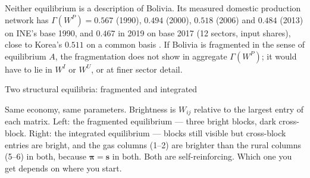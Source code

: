 \documentclass[../structural_economics_book.tex]{subfiles}
\begin{document}
\begin{example}
Neither equilibrium is a description of Bolivia. Its measured domestic production network has $\Gamma(W^P) = 0.567$ (1990), $0.494$ (2000), $0.518$ (2006) and $0.484$ (2013) on INE's base 1990, and $0.467$ in 2019 on base 2017 (12 sectors, input shares), close to Korea's $0.511$ on a common basis \citep{ine2026sut,oecd2023icio}. If Bolivia is fragmented in the sense of equilibrium $A$, the fragmentation does not show in aggregate $\Gamma(W^P)$; it would have to lie in $W^I$ or $W^U$, or at finer sector detail.
\end{example}

\begin{vizpanel}{Two structural equilibria: fragmented and integrated}
\begin{center}
\end{center}
\vspace{-0.5em}
\small Same economy, same parameters. Brightness is $W_{ij}$ relative to the largest entry of each matrix. Left: the fragmented equilibrium --- three bright blocks, dark cross-block. Right: the integrated equilibrium --- blocks still visible but cross-block entries are bright, and the gas columns (1--2) are brighter than the rural columns (5--6) in both, because $\boldsymbol{\pi} = \mathbf{s}$ in both. Both are self-reinforcing. Which one you get depends on where you start.
\end{vizpanel}
\end{document}
